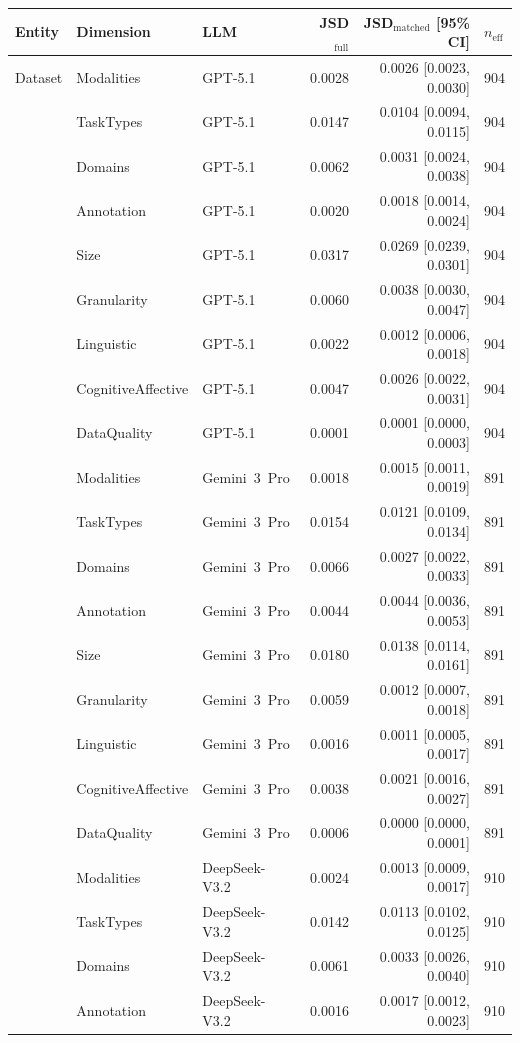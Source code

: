 \begin{tabular}{lllrrl}
\toprule
Entity & Dimension & LLM & JSD$_{\mathrm{full}}$ & JSD$_{\mathrm{matched}}$ [95\% CI] & $n_{\mathrm{eff}}$ \\
\midrule
Dataset & Modalities & GPT-5.1 & 0.0028 & 0.0026 [0.0023, 0.0030] & 904 \\
 & TaskTypes & GPT-5.1 & 0.0147 & 0.0104 [0.0094, 0.0115] & 904 \\
 & Domains & GPT-5.1 & 0.0062 & 0.0031 [0.0024, 0.0038] & 904 \\
 & Annotation & GPT-5.1 & 0.0020 & 0.0018 [0.0014, 0.0024] & 904 \\
 & Size & GPT-5.1 & 0.0317 & 0.0269 [0.0239, 0.0301] & 904 \\
 & Granularity & GPT-5.1 & 0.0060 & 0.0038 [0.0030, 0.0047] & 904 \\
 & Linguistic & GPT-5.1 & 0.0022 & 0.0012 [0.0006, 0.0018] & 904 \\
 & CognitiveAffective & GPT-5.1 & 0.0047 & 0.0026 [0.0022, 0.0031] & 904 \\
 & DataQuality & GPT-5.1 & 0.0001 & 0.0001 [0.0000, 0.0003] & 904 \\
 & Modalities & Gemini~3~Pro & 0.0018 & 0.0015 [0.0011, 0.0019] & 891 \\
 & TaskTypes & Gemini~3~Pro & 0.0154 & 0.0121 [0.0109, 0.0134] & 891 \\
 & Domains & Gemini~3~Pro & 0.0066 & 0.0027 [0.0022, 0.0033] & 891 \\
 & Annotation & Gemini~3~Pro & 0.0044 & 0.0044 [0.0036, 0.0053] & 891 \\
 & Size & Gemini~3~Pro & 0.0180 & 0.0138 [0.0114, 0.0161] & 891 \\
 & Granularity & Gemini~3~Pro & 0.0059 & 0.0012 [0.0007, 0.0018] & 891 \\
 & Linguistic & Gemini~3~Pro & 0.0016 & 0.0011 [0.0005, 0.0017] & 891 \\
 & CognitiveAffective & Gemini~3~Pro & 0.0038 & 0.0021 [0.0016, 0.0027] & 891 \\
 & DataQuality & Gemini~3~Pro & 0.0006 & 0.0000 [0.0000, 0.0001] & 891 \\
 & Modalities & DeepSeek-V3.2 & 0.0024 & 0.0013 [0.0009, 0.0017] & 910 \\
 & TaskTypes & DeepSeek-V3.2 & 0.0142 & 0.0113 [0.0102, 0.0125] & 910 \\
 & Domains & DeepSeek-V3.2 & 0.0061 & 0.0033 [0.0026, 0.0040] & 910 \\
 & Annotation & DeepSeek-V3.2 & 0.0016 & 0.0017 [0.0012, 0.0023] & 910 \\

\end{tabular}
